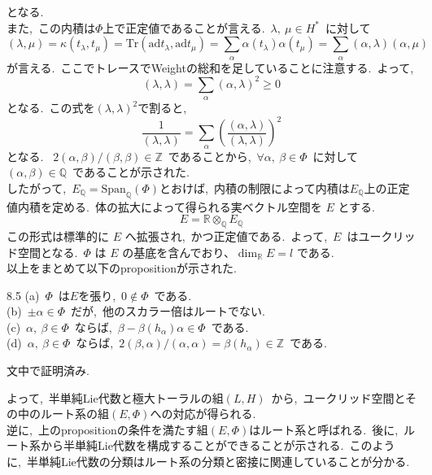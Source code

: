 \documentclass[uplatex,dvipdfmx]{jsarticle}
\begin{document}
となる.\\
また,~この内積は$\Phi$上で正定値であることが言える.~$\lambda,~\mu \in H^*$~に対して
\begin{equation*}
   (\lambda, \mu) = \kappa(t_\lambda, t_\mu) =\text{Tr}(\text{ad}t_\lambda, \text{ad} t_\mu) =  \sum_\alpha \alpha(t_\lambda)\alpha(t_\mu) = \sum_\alpha (\alpha, \lambda)(\alpha, \mu)
\end{equation*}
が言える.~ここでトレースでWeightの総和を足していることに注意する.~よって,
\begin{equation}
    (\lambda, \lambda) = \sum_\alpha (\alpha, \lambda)^2 \geq 0
\end{equation}
となる.~この式を$(\lambda,\lambda)^2$で割ると,
\begin{equation*}
    \frac{1}{(\lambda, \lambda)} = \sum_\alpha \left( \frac{(\alpha, \lambda)}{(\lambda, \lambda)} \right)^2 
\end{equation*}
となる.~ $2(\alpha, \beta) / (\beta, \beta) \in \mathbb{Z}$~であることから,~$\forall \alpha,~\beta \in \Phi$~に対して $(\alpha, \beta) \in \mathbb{Q}$~であることが示された.\\
したがって,~$E_{\mathbb{Q}} = \text{Span}_\mathbb{Q}(\Phi)$とおけば,~内積の制限によって内積は$E_{\mathbb{Q}}$上の正定値内積を定める.~体の拡大によって得られる実ベクトル空間を $E$ とする.
\begin{equation*}
    E = \mathbb{R} \otimes_{\mathbb{Q}} E_{\mathbb{Q}}
\end{equation*}
この形式は標準的に $E$ へ拡張され,~かつ正定値である.~よって,~$E$~はユークリッド空間となる.~$\Phi$ は $E$ の基底を含んでおり、$\dim_{\mathbb{R}} E = l$ である.\\
以上をまとめて以下のpropositionが示された.
\begin{myprop}{8.5}
    (a)~$\Phi$~は$E$を張り,~$0 \notin \Phi$~である.\\
    (b)~$\pm \alpha \in \Phi$~だが,~他のスカラー倍はルートでない.\\
    (c)~$\alpha,~\beta \in \Phi$~ならば,~$\beta- \beta(h_\alpha)\alpha \in \Phi$~である.\\
    (d)~$\alpha,~\beta \in \Phi$~ならば,~$2(\beta, \alpha)/(\alpha, \alpha) = \beta(h_\alpha) \in \mathbb{Z}$~である.
\end{myprop}
\begin{myproof}
    文中で証明済み.
\end{myproof}
よって,~半単純Lie代数と極大トーラルの組$(L,H)$~から,~ユークリッド空間とその中のルート系の組$(E, \Phi)$への対応が得られる.\\
逆に,~上のpropositionの条件を満たす組$(E,\Phi)$はルート系と呼ばれる.~後に,~ルート系から半単純Lie代数を構成することができることが示される.~このように,~半単純Lie代数の分類はルート系の分類と密接に関連していることが分かる.\\
\newpage
\end{document}
